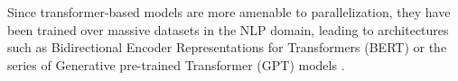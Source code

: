 Since transformer-based models are more amenable to parallelization,
 they have been trained over massive datasets in the NLP domain, leading to architectures such as Bidirectional 
Encoder Representations for Transformers (BERT) \parencite{devlin2018bert}
or the series of Generative
pre-trained Transformer (GPT) models \parencite{radford2018improving, radford2019language, brown2020language}. %


